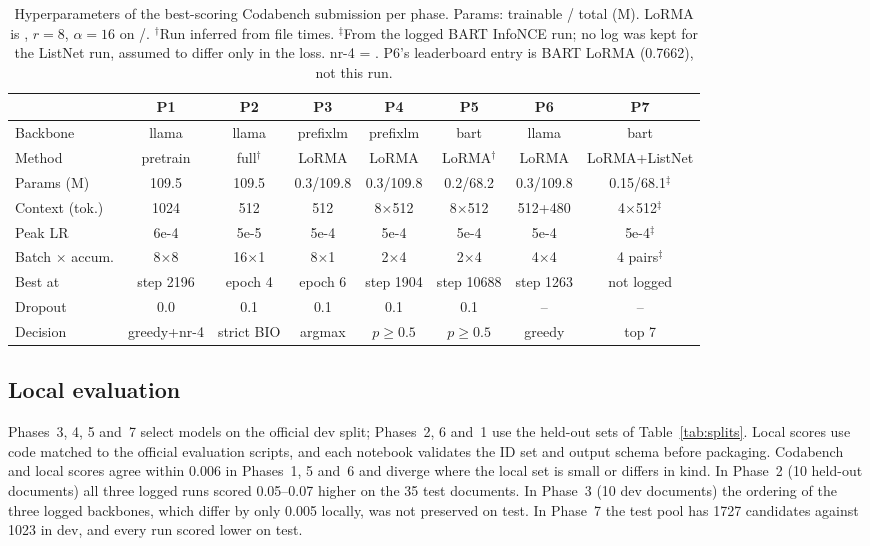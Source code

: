 \documentclass[11pt, oneside]{article}
\newcommand{\tsc}[1]{\texttt{\detokenize{#1}}}
\begin{document}
\begin{table}[t]
\centering
\footnotesize
\caption{Hyperparameters of the best-scoring Codabench submission per phase. Params: trainable / total (M). LoRMA is \tsc{plus}, $r{=}8$, $\alpha{=}16$ on \tsc{q_proj}/\tsc{v_proj}. $^\dagger$Run inferred from file times. $^\ddagger$From the logged BART InfoNCE run; no log was kept for the ListNet run, assumed to differ only in the loss. nr-4 = \tsc{no_repeat_ngram_size=4}. P6's leaderboard entry is BART LoRMA (0.7662), not this run.}
\label{tab:hparams}
\setlength{\tabcolsep}{4pt}
\begin{adjustbox}{max width=\textwidth}\begin{tabular}{lccccccc}
\toprule
 & P1 & P2 & P3 & P4 & P5 & P6 & P7 \\
\midrule
Backbone & llama & llama & prefixlm & prefixlm & bart & llama & bart \\
Method & pretrain & full$^\dagger$ & LoRMA & LoRMA & LoRMA$^\dagger$ & LoRMA & LoRMA+ListNet \\
Params (M) & 109.5 & 109.5 & 0.3/109.8 & 0.3/109.8 & 0.2/68.2 & 0.3/109.8 & 0.15/68.1$^\ddagger$ \\
Context (tok.) & 1024 & 512 & 512 & 8$\times$512 & 8$\times$512 & 512+480 & 4$\times$512$^\ddagger$ \\
Peak LR & 6e-4 & 5e-5 & 5e-4 & 5e-4 & 5e-4 & 5e-4 & 5e-4$^\ddagger$ \\
Batch $\times$ accum. & 8$\times$8 & 16$\times$1 & 8$\times$1 & 2$\times$4 & 2$\times$4 & 4$\times$4 & 4 pairs$^\ddagger$ \\
Best at & step 2196 & epoch 4 & epoch 6 & step 1904 & step 10688 & step 1263 & not logged \\
Dropout & 0.0 & 0.1 & 0.1 & 0.1 & 0.1 & -- & -- \\
Decision & greedy+nr-4 & strict BIO & argmax & $p\geq0.5$ & $p\geq0.5$ & greedy & top 7 \\
\bottomrule
\end{tabular}\end{adjustbox}
\end{table}

\subsection{Local evaluation}
Phases~3, 4, 5 and~7 select models on the official dev split; Phases~2, 6 and~1 use the held-out sets of Table~\ref{tab:splits}. Local scores use code matched to the official evaluation scripts, and each notebook validates the ID set and output schema before packaging. Codabench and local scores agree within 0.006 in Phases~1, 5 and~6 and diverge where the local set is small or differs in kind. In Phase~2 (10 held-out documents) all three logged runs scored 0.05--0.07 higher on the 35 test documents. In Phase~3 (10 dev documents) the ordering of the three logged backbones, which differ by only 0.005 locally, was not preserved on test. In Phase~7 the test pool has 1727 candidates against 1023 in dev, and every run scored lower on test.
\end{document}
